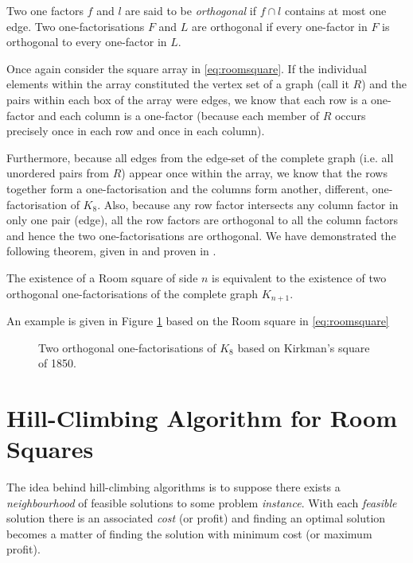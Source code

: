 Two one factors $f$ and $l$ are said to be
\emph{orthogonal}
if $f \cap l$ contains at most one edge. Two one-factorisations
$F$ and $L$ are orthogonal if every one-factor in $F$ is
orthogonal to every one-factor in $L$.

Once again consider the square array in
\eqref{eq:roomsquare}.
If the individual elements within the array constituted the
vertex set of a graph (call it $R$) and the pairs within
each box of the array were edges, we know that each row is a
one-factor and each column is a one-factor (because each
member of $R$ occurs precisely once in each row and once in
each column).

Furthermore, because all edges from the
edge-set of the complete graph (i.e. all unordered pairs
from $R$) appear once within the array, we know that the
rows together form a one-factorisation and the columns form
another, different, one-factorisation of $K_8$. Also,
because any row factor intersects any column factor in only
one pair (edge), all the row factors are orthogonal to all
the column factors and hence the two one-factorisations are
orthogonal. We have demonstrated the following theorem,
given in
\cite{dinitzContemporaryDesignTheory1992}
and proven in
\cite{nemethStudyRoomSquares1969}.

\begin{theorem}
The existence of a Room square of side $n$
is equivalent to the existence of two orthogonal
one-factorisations of the complete graph $K_{n+1}$.
\end{theorem}

An example is given in Figure
\ref{fig:kirkmans-square}
based on the Room square
in 
\eqref{eq:roomsquare}

\begin{figure}
  \centering
  
  \caption{Two orthogonal one-factorisations of $K_{8}$ based on Kirkman's square of 1850.}
  \label{fig:kirkmans-square}
\end{figure}

\section{Hill-Climbing Algorithm for Room Squares}

The idea behind hill-climbing algorithms is to suppose
there exists a
\emph{neighbourhood}
of feasible solutions to
some problem
\emph{instance}.
With each
\emph{feasible}
solution
there is an associated
\emph{cost}
(or profit) and finding
an optimal solution becomes a matter of finding the solution
with minimum cost (or maximum profit).

